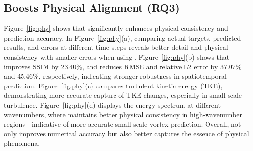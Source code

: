 \subsection{\method{} Boosts Physical Alignment (RQ3)}
Figure~\ref{fig:phy} shows that \method{} significantly enhances physical consistency and prediction accuracy. In Figure~\ref{fig:phy}(a), comparing actual targets, predicted results, and errors at different time steps reveals better detail and physical consistency with smaller errors when using \method{}. Figure~\ref{fig:phy}(b) shows that \method{} improves SSIM by 23.40\%, and reduces RMSE and relative L2 error by 37.07\% and 45.46\%, respectively, indicating stronger robustness in spatiotemporal prediction. Figure~\ref{fig:phy}(c) compares turbulent kinetic energy (TKE), demonstrating more accurate capture of TKE changes, especially in small-scale turbulence. Figure~\ref{fig:phy}(d) displays the energy spectrum at different wavenumbers, where \method{} maintains better physical consistency in high-wavenumber regions—indicative of more accurate small-scale vortex prediction. Overall, \method{} not only improves numerical accuracy but also better captures the essence of physical phenomena.



